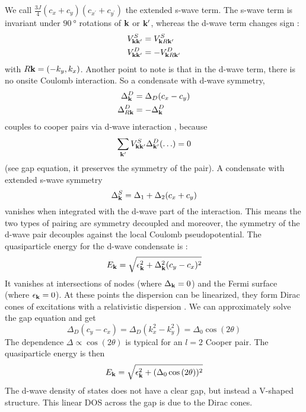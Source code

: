 We call \(\frac{3 J}{4} (c_x  + c_y)(c_{x^{\prime}} + c_{y^{\prime}})\) the extended s-wave term.
The s-wave term is invariant under \(\SI{90}{\degree}\) rotations of \(\mathbf{k}\) or \(\mathbf{k}^{\prime}\), whereas the d-wave term changes sign :
\begin{align}
    V_{\mathbf{k} \mathbf{k}^{\prime}}^S &= V_{\mathbf{k} R\mathbf{k}^{\prime}}^S \\
    V_{\mathbf{k} \mathbf{k}^{\prime}}^D &= -V_{\mathbf{k} R\mathbf{k}^{\prime}}^D
\end{align}
with \(R\mathbf{k} = (-k_y, k_x)\).
Another point to note is that in the d-wave term, there is no onsite Coulomb interaction.
So a condensate with d-wave symmetry,
\begin{align}
    \Delta_{\mathbf{k}}^D &= \Delta_D (c_x - c_y) \\
    \Delta_{R\mathbf{k}}^D &= -\Delta_{\mathbf{k}}^D
\end{align}
couples to cooper pairs via d-wave interaction , because
\begin{equation}
    \sum_{\mathbf{k}^{\prime}} V_{\mathbf{k} \mathbf{k}^{\prime}}^S \Delta_{\mathbf{k}^{\prime}}^D (\ldots) = 0
\end{equation}
(see gap equation, it preserves the symmetry of the pair).
A condensate with extended s-wave symmetry
\begin{equation}
    \Delta_{\mathbf{k}}^S = \Delta_1 + \Delta_2 (c_x + c_y)
\end{equation}
vanishes when integrated with the d-wave part of the interaction.
This means the two types of pairing are symmetry decoupled and moreover, the symmetry of the d-wave pair decouples against the local Coulomb pseudopotential.
The quasiparticle  energy for the d-wave condensate is :
\begin{equation}
    E_{\mathbf{k}} = \sqrt{\epsilon_{\mathbf{k}}^2 + \Delta_{\mathbf{k}}^2 (c_y - c_x)^2}
\end{equation}
It vanishes at intersections of nodes (where \(\Delta_{\mathbf{k}} = 0\)) and the Fermi surface (where \(\epsilon_{\mathbf{k}} = 0\)).
At these points the dispersion can be linearized, they form Dirac cones of excitations with a relativistic dispersion .
We can approximately solve the gap equation and get
\begin{equation}
    \Delta_D (c_y - c_x) = \Delta_D (k_x^2 - k_y^2) = \Delta_0 \cos{(2\theta)}
\end{equation}
The dependence \(\Delta \propto \cos{(2\theta)}\) is typical for an \(l=2\) Cooper pair. 
The quasiparticle energy is then
\begin{equation}
    E_{\mathbf{k}} = \sqrt{\epsilon_{\mathbf{k}}^2 + (\Delta_0 \cos{(2\theta)})^2}
\end{equation}
The d-wave density of states does not have a clear gap, but instead a V-shaped structure.
This linear DOS across the gap is due to the Dirac cones.
